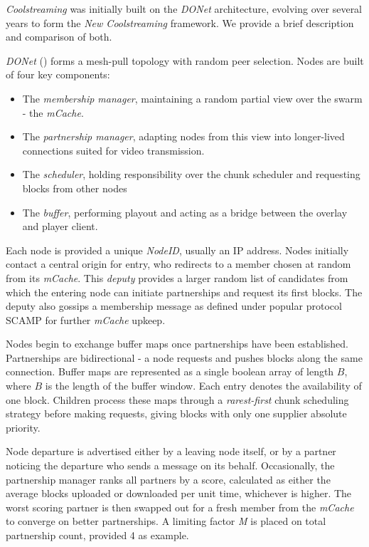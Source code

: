 \documentclass[12pt,a4paper]{article}
\begin{document}
\textit{Coolstreaming} was initially built on the \textit{DONet} architecture, evolving over several years to form the \textit{New Coolstreaming} framework. We provide a brief description and comparison of both.

\textit{DONet} (\cite{Zhang2005}) forms a mesh-pull topology with random peer selection. Nodes are built of four key components:

\begin{itemize}
	\item The \textit{membership manager}, maintaining a random partial view over the swarm - the \textit{mCache}.
	\item The \textit{partnership manager}, adapting nodes from this view into longer-lived connections suited for video transmission.
	\item The \textit{scheduler}, holding responsibility over the chunk scheduler and requesting blocks from other nodes
	\item The \textit{buffer}, performing playout and acting as a bridge between the overlay and player client.
\end{itemize} 

Each node is provided a unique \textit{NodeID}, usually an IP address. Nodes initially contact a central origin for entry, who redirects to a member chosen at random from its \textit{mCache}. This \textit{deputy} provides a larger random list of candidates from which the entering node can initiate partnerships and request its first blocks. The deputy also gossips a membership message as defined under popular protocol SCAMP for further \textit{mCache} upkeep.

Nodes begin to exchange buffer maps once partnerships have been established. Partnerships are bidirectional - a node requests and pushes blocks along the same connection. Buffer maps are represented as a single boolean array of length \(B\), where \(B\) is the length of the buffer window. Each entry denotes the availability of one block. Children process these maps through a \textit{rarest-first} chunk scheduling strategy before making requests, giving blocks with only one supplier absolute priority.

Node departure is advertised either by a leaving node itself, or by a partner noticing the departure who sends a message on its behalf. Occasionally, the partnership manager ranks all partners by a score, calculated as either the average blocks uploaded or downloaded per unit time, whichever is higher. The worst scoring partner is then swapped out for a fresh member from the \textit{mCache} to converge on better partnerships. A limiting factor \textit{M} is placed on total partnership count, provided 4 as example.
\end{document}
